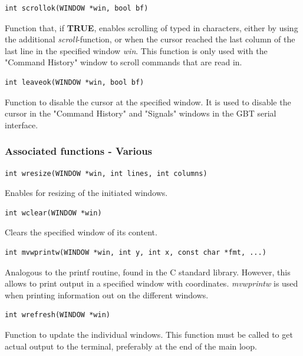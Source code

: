 \documentclass[main.tex]{subfiles}
\begin{document}
\begin{lstlisting}[frame=single] 
int scrollok(WINDOW *win, bool bf)
\end{lstlisting}
Function that, if \textbf{TRUE}, enables scrolling of typed in characters, either by using the additional \textit{scroll}-function, or when the cursor reached the last column of the last line in the specified window \textit{win}. This function is only used with the "Command History" window to scroll commands that are read in.\\

\begin{lstlisting}[frame=single] 
int leaveok(WINDOW *win, bool bf)
\end{lstlisting}
Function to disable the cursor at the specified window. It is used to disable the cursor in the "Command History" and "Signals" windows in the GBT serial interface.  

\subsubsection{Associated functions - Various}

\begin{lstlisting}[frame=single] 
int wresize(WINDOW *win, int lines, int columns)
\end{lstlisting}
Enables for resizing of the initiated windows. \\

\begin{lstlisting}[frame=single] 
int wclear(WINDOW *win)
\end{lstlisting}
Clears the specified window of its content. \\

\begin{lstlisting}[frame=single] 
int mvwprintw(WINDOW *win, int y, int x, const char *fmt, ...)
\end{lstlisting}
Analogous to the printf routine, found in the C standard library. However, this allows to print output in a specified window with coordinates. \textit{mvwprintw} is used when printing information out on the different windows. \\

\begin{lstlisting}[frame=single] 
int wrefresh(WINDOW *win)
\end{lstlisting}
Function to update the individual windows. This function must be called to get actual output to the terminal, preferably at the end of the main loop. \\
\end{document}
